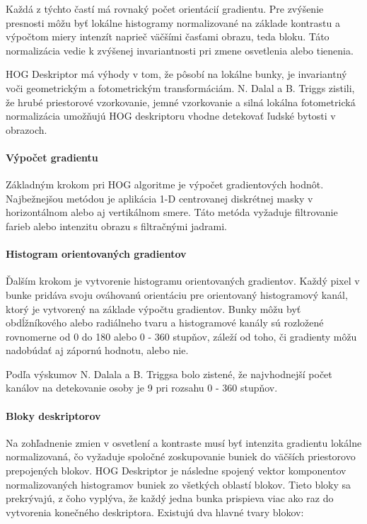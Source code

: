 Každá z týchto častí  má rovnaký počet orientácií gradientu.  Pre zvýšenie presnosti môžu byť lokálne histogramy normalizované na základe kontrastu a výpočtom miery intenzít naprieč väčšími časťami obrazu, teda bloku. Táto normalizácia vedie k zvýšenej invariantnosti pri zmene osvetlenia alebo tienenia. 

HOG Deskriptor má výhody v tom, že pôsobí na lokálne bunky, je invariantný voči geometrickým a fotometrickým transformáciám. N. Dalal a B. Triggs zistili, že hrubé priestorové vzorkovanie, jemné vzorkovanie a silná lokálna fotometrická normalizácia umožňujú HOG deskriptoru vhodne detekovať ľudské bytosti v obrazoch. 

\paragraph{Výpočet gradientu}

Základným krokom pri HOG algoritme je výpočet gradientových hodnôt. Najbežnejšou metódou je aplikácia 1-D centrovanej diskrétnej masky v horizontálnom alebo aj vertikálnom smere. Táto metóda vyžaduje filtrovanie farieb alebo intenzitu obrazu s filtračnými jadrami.

\paragraph{Histogram orientovaných gradientov}
Ďalším krokom je vytvorenie histogramu orientovaných gradientov. Každý pixel v bunke pridáva svoju ováhovanú orientáciu pre orientovaný histogramový kanál, ktorý je vytvorený na základe výpočtu gradientov. Bunky môžu byť obdĺžníkového alebo radiálneho tvaru a histogramové kanály sú rozložené rovnomerne od 0 do 180 alebo 0 - 360 stupňov, záleží od toho, či gradienty môžu nadobúdať aj zápornú hodnotu, alebo nie. 

Podľa výskumov  N. Dalala a B. Triggsa bolo zistené, že najvhodnejší počet kanálov na detekovanie osoby je 9 pri rozsahu 0 - 360 stupňov.

\paragraph{Bloky deskriptorov}
Na zohľadnenie zmien v osvetlení a kontraste musí byť intenzita gradientu lokálne normalizovaná, čo vyžaduje spoločné zoskupovanie buniek do väčších priestorovo prepojených blokov. HOG Deskriptor je následne spojený vektor komponentov normalizovaných histogramov buniek zo všetkých oblastí blokov. Tieto bloky sa prekrývajú, z čoho vyplýva, že každý jedna bunka prispieva viac ako raz do vytvorenia konečného deskriptora. Existujú dva hlavné tvary blokov:

